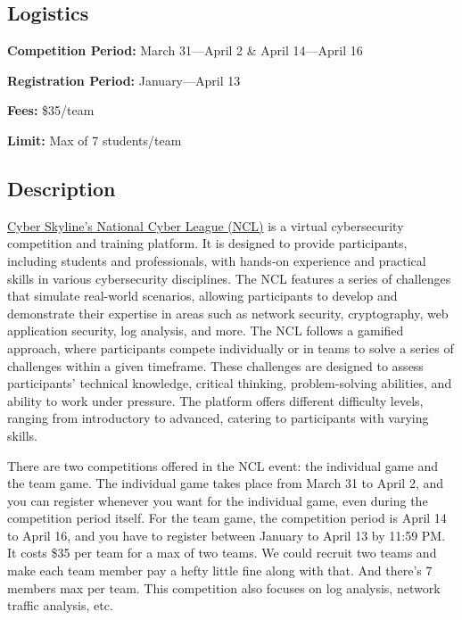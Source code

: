 \documentclass[
  letterpaper,
  DIV=11,
  numbers=noendperiod]{scrartcl}
\begin{document}
\hypertarget{logistics-9}{%
\subsection{Logistics}\label{logistics-9}}

\textbf{Competition Period:} March 31---April 2 \& April 14---April 16

\textbf{Registration Period:} January---April 13

\textbf{Fees:} \$35/team

\textbf{Limit:} Max of 7 students/team

\hypertarget{description-9}{%
\subsection{Description}\label{description-9}}

\href{https://cyberskyline.com/events/ncl}{Cyber Skyline's National
Cyber League (NCL)} is a virtual cybersecurity competition and training
platform. It is designed to provide participants, including students and
professionals, with hands-on experience and practical skills in various
cybersecurity disciplines. The NCL features a series of challenges that
simulate real-world scenarios, allowing participants to develop and
demonstrate their expertise in areas such as network security,
cryptography, web application security, log analysis, and more. The NCL
follows a gamified approach, where participants compete individually or
in teams to solve a series of challenges within a given timeframe. These
challenges are designed to assess participants' technical knowledge,
critical thinking, problem-solving abilities, and ability to work under
pressure. The platform offers different difficulty levels, ranging from
introductory to advanced, catering to participants with varying skills.

There are two competitions offered in the NCL event: the individual game
and the team game. The individual game takes place from March 31 to
April 2, and you can register whenever you want for the individual game,
even during the competition period itself. For the team game, the
competition period is April 14 to April 16, and you have to register
between January to April 13 by 11:59 PM. It costs \$35 per team for a
max of two teams. We could recruit two teams and make each team member
pay a hefty little fine along with that. And there's 7 members max per
team. This competition also focuses on log analysis, network traffic
analysis, etc.
\end{document}
